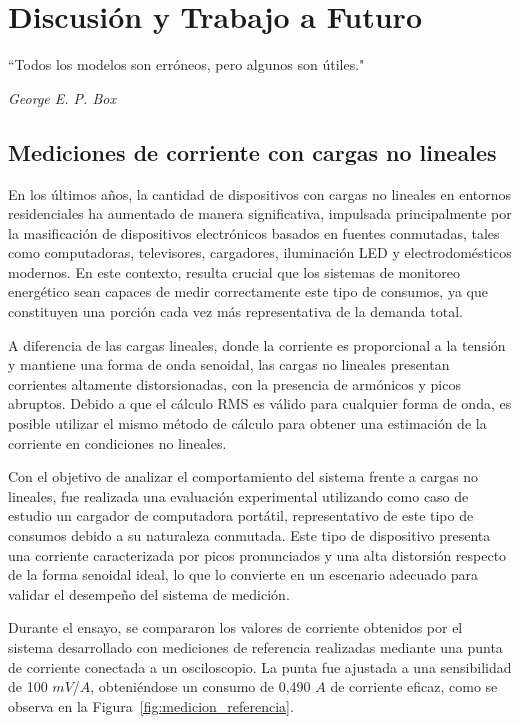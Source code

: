 \cleardoublepage                                  %
\chapter{Discusión y Trabajo a Futuro}
\label{cap:Discusion}
\epigraph{``Todos los modelos son erróneos, pero algunos son útiles."}{\textit{George E. P. Box}}
\section{Mediciones de corriente con cargas no lineales}

En los últimos años, la cantidad de dispositivos con cargas no lineales en entornos residenciales ha aumentado de manera significativa, impulsada principalmente por la masificación de dispositivos electrónicos basados en fuentes conmutadas, tales como computadoras, televisores, cargadores, iluminación LED y electrodomésticos modernos. En este contexto, resulta crucial que los sistemas de monitoreo energético sean capaces de medir correctamente este tipo de consumos, ya que constituyen una porción cada vez más representativa de la demanda total.

A diferencia de las cargas lineales, donde la corriente es proporcional a la tensión y mantiene una forma de onda senoidal, las cargas no lineales presentan corrientes altamente distorsionadas, con la presencia de armónicos y picos abruptos. 
Debido a que el cálculo RMS es válido para cualquier forma de onda, es posible utilizar el mismo método de cálculo para obtener una estimación de la corriente en condiciones no lineales.

Con el objetivo de analizar el comportamiento del sistema frente a cargas no lineales, fue realizada una evaluación experimental utilizando como caso de estudio un cargador de computadora portátil, representativo de este tipo de consumos debido a su naturaleza conmutada. Este tipo de dispositivo presenta una corriente caracterizada por picos pronunciados y una alta distorsión respecto de la forma senoidal ideal, lo que lo convierte en un escenario adecuado para validar el desempeño del sistema de medición.

Durante el ensayo, se compararon los valores de corriente obtenidos por el sistema desarrollado con mediciones de referencia realizadas mediante una punta de corriente conectada a un osciloscopio. La punta fue ajustada a una sensibilidad de 100 $mV$/$A$, obteniéndose un consumo de 0,490 $A$ de corriente eficaz, como se observa en la Figura~\ref{fig:medicion_referencia}.

